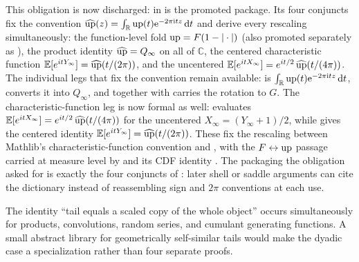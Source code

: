 \documentclass[11pt,oneside]{article}
\numberwithin{equation}{section}
\theoremstyle{definition}
\theoremstyle{remark}
\newcommand{\R}{\mathbb R}
\newcommand{\C}{\mathbb C}
\newcommand{\e}{\mathrm e}
\newcommand{\ii}{\mathrm i}
\newcommand{\dd}{\,\mathrm d}
\begin{document}
This obligation is now discharged:  in
 is the promoted package.  Its four conjuncts fix the
convention \(\widehat{\Up}(z)=\int_\R\Up(t)\e^{-2\pi\ii tz}\dd t\) and derive every rescaling
simultaneously: the function-level fold \(\operatorname{up}=F(1-|\cdot|)\) (also promoted separately as
), the product identity
\(\widehat{\operatorname{up}}=Q_\infty\) on all of \(\C\), the centered characteristic function
\(\mathbb{E}[e^{itY_\infty}]=\widehat{\operatorname{up}}(t/(2\pi))\), and the uncentered
\(\mathbb{E}[e^{itX_\infty}]=e^{it/2}\,\widehat{\operatorname{up}}(t/(4\pi))\).  The individual legs that fix the
convention remain available:  is
$\int_\R\Up(t)\e^{-2\pi\ii tz}\dd t$,
 converts it into $Q_\infty$, and
 together with
 carries the rotation to $G$.  The
characteristic-function leg is now formal as well:
 evaluates
\(\mathbb{E}[e^{itX_\infty}]=e^{it/2}\,\widehat{\operatorname{up}}(t/(4\pi))\) for the uncentered
\(X_\infty=(Y_\infty+1)/2\), while
 gives the centered identity
\(\mathbb{E}[e^{itY_\infty}]=\widehat{\operatorname{up}}(t/(2\pi))\).  These fix the rescaling between
Mathlib's characteristic-function convention and , with
the \(F\leftrightarrow\operatorname{up}\) passage carried at measure level by
 and its CDF identity
.  The packaging the obligation asked for is exactly the four
conjuncts of : later shell or saddle arguments
can cite the dictionary instead of reassembling sign and \(2\pi\) conventions at each use.

\begin{obligation}
The identity ``tail equals a scaled copy of the whole object'' occurs simultaneously for
products, convolutions, random series, and cumulant generating functions.  A small abstract
library for geometrically self-similar tails would make the dyadic case a specialization
rather than four separate proofs.
\end{obligation}
\end{document}
